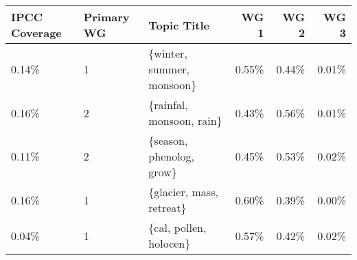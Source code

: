 \begin{tabular}{p{1.4cm} p{1cm} l r r r}
\toprule
 IPCC Coverage &  Primary WG &                Topic Title &  WG 1 &  WG 2 &  WG 3 \\
\midrule
         0.14\% &           1 &  \{winter, summer, monsoon\} & 0.55\% & 0.44\% & 0.01\% \\
         0.16\% &           2 &   \{rainfal, monsoon, rain\} & 0.43\% & 0.56\% & 0.01\% \\
         0.11\% &           2 &   \{season, phenolog, grow\} & 0.45\% & 0.53\% & 0.02\% \\
         0.16\% &           1 &   \{glacier, mass, retreat\} & 0.60\% & 0.39\% & 0.00\% \\
         0.04\% &           1 &     \{cal, pollen, holocen\} & 0.57\% & 0.42\% & 0.02\% \\
\bottomrule
\end{tabular}
